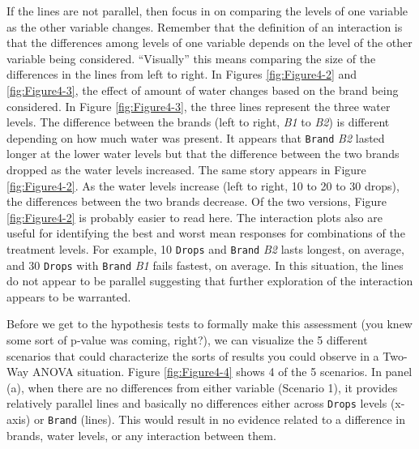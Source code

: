 \documentclass[]{book}
\theoremstyle{definition}
\theoremstyle{definition}
\theoremstyle{remark}
\begin{document}
If the lines are not parallel, then focus in on comparing the levels of
one variable as the other variable changes. Remember that the definition
of an interaction is that the differences among levels of one variable
depends on the level of the other variable being considered.
``Visually'' this means comparing the size of the differences in the
lines from left to right. In Figures \ref{fig:Figure4-2} and
\ref{fig:Figure4-3}, the effect of amount of water changes based on the
brand being considered. In Figure \ref{fig:Figure4-3}, the three lines
represent the three water levels. The difference between the brands
(left to right, \emph{B1} to \emph{B2}) is different depending on how
much water was present. It appears that \texttt{Brand} \emph{B2} lasted
longer at the lower water levels but that the difference between the two
brands dropped as the water levels increased. The same story appears in
Figure \ref{fig:Figure4-2}. As the water levels increase (left to right,
10 to 20 to 30 drops), the differences between the two brands decrease.
Of the two versions, Figure \ref{fig:Figure4-2} is probably easier to
read here. The interaction plots also are useful for identifying the
best and worst mean responses for combinations of the treatment levels.
For example, 10 \texttt{Drops} and \texttt{Brand} \emph{B2} lasts
longest, on average, and 30 \texttt{Drops} with \texttt{Brand} \emph{B1}
fails fastest, on average. In this situation, the lines do not appear to
be parallel suggesting that further exploration of the interaction
appears to be warranted.

Before we get to the hypothesis tests to formally make this assessment
(you knew some sort of p-value was coming, right?), we can visualize the
5 different scenarios that could characterize the sorts of results you
could observe in a Two-Way ANOVA situation. Figure \ref{fig:Figure4-4}
shows 4 of the 5 scenarios. In panel (a), when there are no differences
from either variable (Scenario 1), it provides relatively parallel lines
and basically no differences either across \texttt{Drops} levels
(x-axis) or \texttt{Brand} (lines). This would result in no evidence
related to a difference in brands, water levels, or any interaction
between them.
\end{document}
